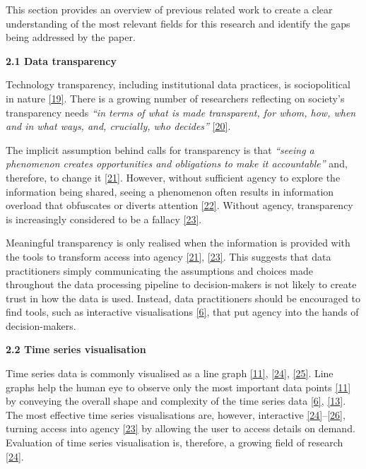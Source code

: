 \documentclass{article}
\begin{document}
This section provides an overview of previous related work to create a
clear understanding of the most relevant fields for this research and
identify the gaps being addressed by the paper.

\textbf{2.1 Data transparency}

Technology transparency, including institutional data practices, is
sociopolitical in nature
\protect\hyperlink{ref-political_transparency}{{[}19{]}}. There is a
growing number of researchers reflecting on society's transparency needs
\emph{``in terms of what is made transparent, for whom, how, when and in
what ways, and, crucially, who decides''}
\protect\hyperlink{ref-social_transparency}{{[}20{]}}.

The implicit assumption behind calls for transparency is that
\emph{``seeing a phenomenon creates opportunities and obligations to
make it accountable''} and, therefore, to change it
\protect\hyperlink{ref-transparency_lack}{{[}21{]}}. However, without
sufficient agency to explore the information being shared, seeing a
phenomenon often results in information overload that obfuscates or
diverts attention
\protect\hyperlink{ref-transparency_obfuscation}{{[}22{]}}. Without
agency, transparency is increasingly considered to be a fallacy
\protect\hyperlink{ref-transparency_fallacy}{{[}23{]}}.

Meaningful transparency is only realised when the information is
provided with the tools to transform access into agency
\protect\hyperlink{ref-transparency_lack}{{[}21{]}},
\protect\hyperlink{ref-transparency_fallacy}{{[}23{]}}. This suggests
that data practitioners simply communicating the assumptions and choices
made throughout the data processing pipeline to decision-makers is not
likely to create trust in how the data is used. Instead, data
practitioners should be encouraged to find tools, such as interactive
visualisations \protect\hyperlink{ref-datapoint}{{[}6{]}}, that put
agency into the hands of decision-makers.

\textbf{2.2 Time series visualisation}

Time series data is commonly visualised as a line graph
\protect\hyperlink{ref-Sveinn}{{[}11{]}},
\protect\hyperlink{ref-timenotes}{{[}24{]}},
\protect\hyperlink{ref-timetuner}{{[}25{]}}. Line graphs help the human
eye to observe only the most important data points
\protect\hyperlink{ref-Sveinn}{{[}11{]}} by conveying the overall shape
and complexity of the time series data
\protect\hyperlink{ref-datapoint}{{[}6{]}},
\protect\hyperlink{ref-downsampling}{{[}13{]}}. The most effective time
series visualisations are, however, interactive
\protect\hyperlink{ref-timenotes}{{[}24{]}}--\protect\hyperlink{ref-plotly}{{[}26{]}},
turning access into agency
\protect\hyperlink{ref-transparency_fallacy}{{[}23{]}} by allowing the
user to access details on demand. Evaluation of time series
visualisation is, therefore, a growing field of research
\protect\hyperlink{ref-timenotes}{{[}24{]}}.
\end{document}
